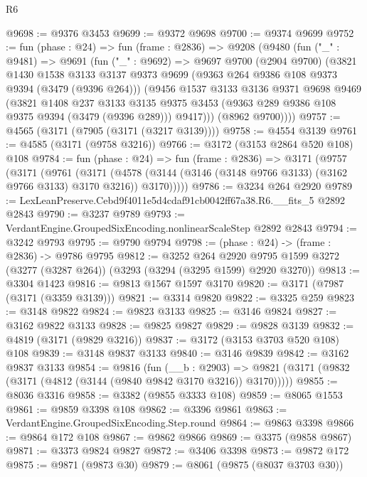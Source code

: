 \begin{lexlean}{R6}
\begin{coremodule}
@9698 := @9376 @3453
@9699 := @9372 @9698
@9700 := @9374 @9699
@9752 := fun (phase : @24) =>
  fun (frame : @2836) =>
  @9208
    (@9480
      (fun ("_" : @9481) =>
      @9691
        (fun ("_" : @9692) =>
        @9697
          @9700
          (@2904 @9700)
          (@3821
            @1430
            @1538
            @3133
            @3137
            @9373
            @9699
            (@9363 @264 @9386 @108 @9373 @9394 (@3479 (@9396 @264)))
            (@9456
              @1537
              @3133
              @3136
              @9371
              @9698
              @9469
              (@3821
                @1408
                @237
                @3133
                @3135
                @9375
                @3453
                (@9363 @289 @9386 @108 @9375 @9394 (@3479 (@9396 @289)))
                @9417)))
          (@8962 @9700))))
@9757 := @4565 (@3171 (@7905 (@3171 (@3217 @3139))))
@9758 := @4554 @3139
@9761 := @4585 (@3171 (@9758 @3216))
@9766 := @3172 (@3153 @2864 @520 @108) @108
@9784 := fun (phase : @24) =>
  fun (frame : @2836) =>
  @3171
    (@9757
      (@3171
        (@9761
          (@3171
            (@4578 (@3144 (@3146 (@3148 @9766 @3133) (@3162 @9766 @3133) @3170 @3216)) @3170)))))
@9786 := @3234 @264 @2920
@9789 := LexLeanPreserve.Cebd9f4011e5d4cdaf91cb0042ff67a38.R6.__fits_5 @2892 @2843
@9790 := @3237 @9789
@9793 := VerdantEngine.GroupedSixEncoding.nonlinearScaleStep @2892 @2843
@9794 := @3242 @9793
@9795 := @9790 @9794
@9798 := (phase : @24) -> (frame : @2836) -> @9786 @9795
@9812 := @3252
    @264
    @2920
    @9795
    @1599
    @3272
    (@3277 (@3287 @264))
    (@3293 (@3294 (@3295 @1599) @2920 @3270))
@9813 := @3304 @1423
@9816 := @9813 @1567 @1597 @3170
@9820 := @3171 (@7987 (@3171 (@3359 @3139)))
@9821 := @3314 @9820
@9822 := @3325 @259
@9823 := @3148 @9822
@9824 := @9823 @3133
@9825 := @3146 @9824
@9827 := @3162 @9822 @3133
@9828 := @9825 @9827
@9829 := @9828 @3139
@9832 := @4819 (@3171 (@9829 @3216))
@9837 := @3172 (@3153 @3703 @520 @108) @108
@9839 := @3148 @9837 @3133
@9840 := @3146 @9839
@9842 := @3162 @9837 @3133
@9854 := @9816
    (fun (__b : @2903) =>
    @9821 (@3171 (@9832 (@3171 (@4812 (@3144 (@9840 @9842 @3170 @3216)) @3170)))))
@9855 := @8036 @3316
@9858 := @3382 (@9855 @3333 @108)
@9859 := @8065 @1553
@9861 := @9859 @3398 @108
@9862 := @3396 @9861
@9863 := VerdantEngine.GroupedSixEncoding.Step.round
@9864 := @9863 @3398
@9866 := @9864 @172 @108
@9867 := @9862 @9866
@9869 := @3375 (@9858 @9867)
@9871 := @3373 @9824 @9827
@9872 := @3406 @3398
@9873 := @9872 @172
@9875 := @9871 (@9873 @30)
@9879 := @8061 (@9875 (@8037 @3703 @30))

\end{coremodule}
\end{lexlean}
